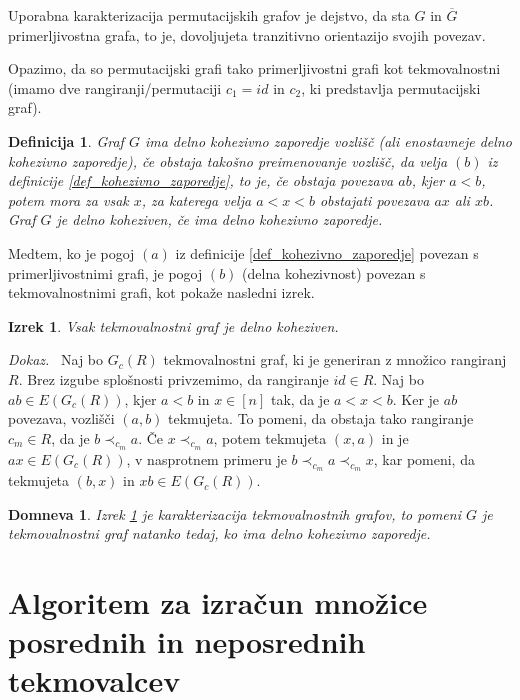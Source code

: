 \documentclass[a4paper, 12pt]{book}
\newtheorem{definicija}{Definicija}[chapter]
\newtheorem{izrek}{Izrek}[chapter]
\newtheorem{domneva}{Domneva}[chapter]
\newenvironment{dokaz}{\emph{Dokaz.}\ }{\hspace{\fill}{$\Box$}}
\begin{document}
Uporabna karakterizacija permutacijskih grafov je dejstvo, da sta $G$ in $\overline{G}$ primerljivostna grafa, to je, dovoljujeta tranzitivno orientazijo svojih povezav. 

Opazimo, da so permutacijski grafi tako primerljivostni grafi kot tekmovalnostni (imamo dve rangiranji/permutaciji $c_1 = id$ in $c_2$, ki predstavlja permutacijski graf).

\begin{definicija}
    Graf $G$ ima delno kohezivno zaporedje vozlišč (ali enostavneje delno kohezivno zaporedje), če obstaja takošno preimenovanje vozlišč, da velja $(b)$ iz definicije \ref{def_kohezivno_zaporedje}, to je, če obstaja povezava $ab$, kjer $a < b$, potem mora za vsak $x$, za katerega velja $a < x < b$ obstajati povezava $ax$ ali $xb$. Graf $G$ je delno koheziven, če ima delno kohezivno zaporedje.
\end{definicija}

Medtem, ko je pogoj $(a)$ iz definicije \ref{def_kohezivno_zaporedje} povezan s primerljivostnimi grafi, je pogoj $(b)$ (delna kohezivnost) povezan s tekmovalnostnimi grafi, kot pokaže nasledni izrek.

\begin{izrek}
\label{tekmovalnosni_graf_delno_koheziven}
    Vsak tekmovalnostni graf je delno koheziven.
\end{izrek}
\begin{dokaz}
    Naj bo $G_c(R)$ tekmovalnostni graf, ki je generiran z množico rangiranj $R$. Brez izgube splošnosti privzemimo, da rangiranje $id \in R$. Naj bo $ab \in E(G_c(R))$, kjer $a < b$ in $x \in [n]$ tak, da je $a < x < b$. Ker je $ab$ povezava, vozlišči $(a, b)$ tekmujeta. To pomeni, da obstaja tako rangiranje $c_m \in R$, da je $b \prec_{c_m} a$. Če $x \prec_{c_m} a$, potem tekmujeta $(x, a)$ in je $ax \in E(G_c(R))$, v nasprotnem primeru je $b \prec_{c_m} a \prec_{c_m} x$, kar pomeni, da tekmujeta $(b, x)$ in $xb \in E(G_c(R))$.
\end{dokaz}

\begin{domneva}
    Izrek \ref{tekmovalnosni_graf_delno_koheziven} je karakterizacija tekmovalnostnih grafov, to pomeni $G$ je tekmovalnostni graf natanko tedaj, ko ima delno kohezivno zaporedje.
\end{domneva}

\section{ Algoritem za izračun množice posrednih in neposrednih tekmovalcev }
\end{document}
